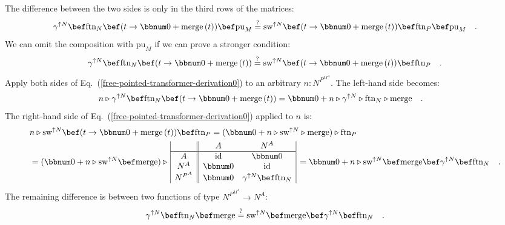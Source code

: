 The difference between the two sides is only in the third rows of
the matrices:
\[
\gamma^{\uparrow N}\bef\text{ftn}_{N}\bef(t\rightarrow\bbnum 0+\text{merge}\,(t))\bef\text{pu}_{M}\overset{?}{=}\text{sw}^{\uparrow N}\bef(t\rightarrow\bbnum 0+\text{merge}\,(t))\bef\text{ftn}_{P}\bef\text{pu}_{M}\quad.
\]
We can omit the composition with $\text{pu}_{M}$ if we can prove
a stronger condition:
\begin{equation}
\gamma^{\uparrow N}\bef\text{ftn}_{N}\bef(t\rightarrow\bbnum 0+\text{merge}\,(t))\overset{?}{=}\text{sw}^{\uparrow N}\bef(t\rightarrow\bbnum 0+\text{merge}\,(t))\bef\text{ftn}_{P}\quad.\label{free-pointed-transformer-derivation0}
\end{equation}
Apply both sides of Eq.~(\ref{free-pointed-transformer-derivation0})
to an arbitrary $n:N^{P^{M^{A}}}$. The left-hand side becomes:
\begin{align*}
 & n\triangleright\gamma^{\uparrow N}\bef\text{ftn}_{N}\bef(t\rightarrow\bbnum 0+\text{merge}\,(t))=\bbnum 0+n\triangleright\gamma^{\uparrow N}\triangleright\text{ftn}_{N}\triangleright\text{merge}\quad.
\end{align*}
The right-hand side of Eq.~(\ref{free-pointed-transformer-derivation0})
applied to $n$ is:
\begin{align*}
 & n\triangleright\text{sw}^{\uparrow N}\bef(t\rightarrow\bbnum 0+\text{merge}\,(t))\bef\text{ftn}_{P}=(\bbnum 0+n\triangleright\text{sw}^{\uparrow N}\triangleright\text{merge})\triangleright\text{ftn}_{P}\\
 & =(\bbnum 0+n\triangleright\text{sw}^{\uparrow N}\bef\text{merge})\triangleright\,\begin{array}{|c||cc|}
 & A & N^{A}\\
\hline A & \text{id} & \bbnum 0\\
N^{A} & \bbnum 0 & \text{id}\\
N^{P^{A}} & \bbnum 0 & \gamma^{\uparrow N}\bef\text{ftn}_{N}
\end{array}\,=\bbnum 0+n\triangleright\text{sw}^{\uparrow N}\bef\text{merge}\bef\gamma^{\uparrow N}\bef\text{ftn}_{N}\quad.
\end{align*}
The remaining difference is between two functions of type $N^{P^{M^{A}}}\rightarrow N^{A}$:
\begin{equation}
\gamma^{\uparrow N}\bef\text{ftn}_{N}\bef\text{merge}\overset{?}{=}\text{sw}^{\uparrow N}\bef\text{merge}\bef\gamma^{\uparrow N}\bef\text{ftn}_{N}\quad.\label{eq:free-pointed-transformer-derivation1}
\end{equation}
